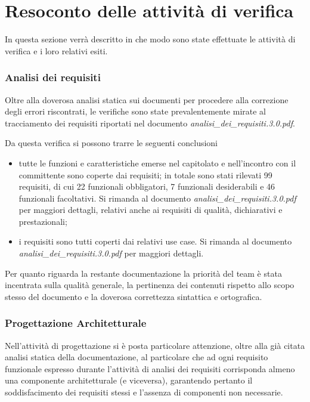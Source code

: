 \clearpage

\section{Resoconto delle attività di verifica}
In questa sezione verrà descritto in che modo sono state effettuate le attività di verifica e i loro relativi esiti.

\subsubsection{Analisi dei requisiti}
Oltre alla doverosa analisi statica sui documenti per procedere alla correzione degli errori riscontrati, le verifiche sono state prevalentemente mirate al tracciamento dei requisiti riportati nel documento \textit{analisi\_dei\_requisiti.3.0.pdf}.

Da questa verifica si possono trarre le seguenti conclusioni
\begin{itemize}
\item tutte le funzioni e caratteristiche emerse nel capitolato e nell'incontro con il committente sono coperte dai requisiti;
in totale sono stati rilevati 99 requisiti, di cui 22 funzionali obbligatori, 7 funzionali desiderabili e 46 funzionali facoltativi. Si rimanda al documento \textit{analisi\_dei\_requisiti.3.0.pdf} per maggiori dettagli, relativi anche ai requisiti di qualità, dichiarativi e prestazionali;

\item i requisiti sono tutti coperti dai relativi use case. Si rimanda al documento \textit{analisi\_dei\_requisiti.3.0.pdf} per maggiori dettagli.
\end{itemize}

Per quanto riguarda la restante documentazione la priorità del team è stata incentrata sulla qualità generale, la pertinenza dei contenuti rispetto allo scopo stesso del documento e la doverosa correttezza sintattica e ortografica.

\subsubsection {Progettazione Architetturale}
Nell'attività di progettazione si è posta particolare attenzione, oltre alla già citata analisi statica della documentazione, al particolare che ad ogni requisito funzionale espresso durante l'attività di analisi dei requisiti corrisponda almeno una componente architetturale (e viceversa), garantendo pertanto il soddisfacimento dei requisiti stessi e l'assenza di componenti non necessarie.

